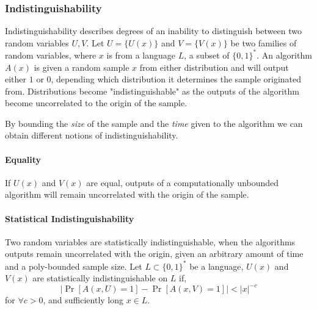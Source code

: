 \subsubsection{Indistinguishability}
Indistinguishability describes degrees of an inability to distinguish between two random variables $U, V$.
\bigskip
\newline
Let $U = \{U(x)\}$ and $V = \{V(x)\}$ be two families of random variables, where $x$ is from a language $L$, a subset of $\{0, 1\}^*$.
\newline
An algorithm $A(x)$ is given a random sample $x$ from either distribution and will output either $1$ or $0$, depending which distribution it determines the sample originated from.
Distributions become "indistinguishable" as the outputs of the algorithm become uncorrelated to the origin of the sample.

By bounding the \textit{size} of the sample and the \textit{time} given to the algorithm we can obtain different notions of indistinguishability.

%
%
%


\paragraph{Equality} 

If $U(x)$ and $V(x)$ are equal, outputs of a computationally unbounded algorithm will remain uncorrelated with the origin of the sample.

\paragraph{Statistical Indistinguishability} Two random variables are statistically indistinguishable, when the algorithms outputs remain uncorrelated with the origin, given an arbitrary amount of time and a poly-bounded sample size.
\bigskip
\newline
Let $L \subset \{0,1\}^*$ be a language, $U(x)$ and $V(x)$ are statistically indistinguishable on $L$ if,
\bigskip
$$|\Pr [A(x, U) = 1] - \Pr [A(x, V) = 1]| < |x|^{-c}$$ %
\bigskip
\newline
for $\forall c > 0$, and sufficiently long $x \in L$. 

